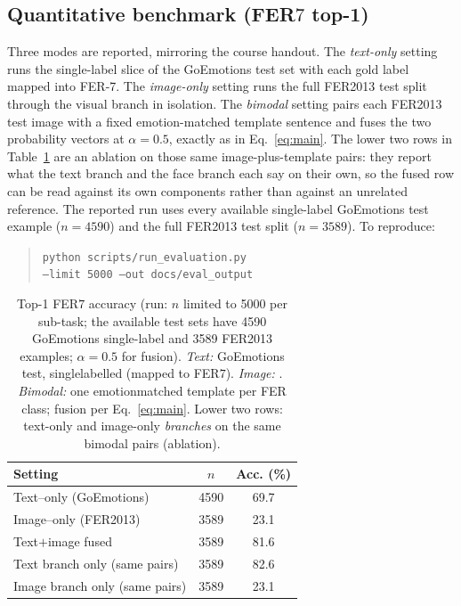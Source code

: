 \documentclass[sigconf,nonacm]{acmart}
\begin{document}
\subsection{Quantitative benchmark (FER\texorpdfstring{$7$}{\,7} top-1)}
Three modes are reported, mirroring the course handout. The \emph{text-only} setting runs the single-label slice of the GoEmotions test set with each gold label mapped into FER-7. The \emph{image-only} setting runs the full FER2013 test split through the visual branch in isolation. The \emph{bimodal} setting pairs each FER2013 test image with a fixed emotion-matched template sentence and fuses the two probability vectors at $\alpha\!=\!0.5$, exactly as in Eq.~\ref{eq:main}. The lower two rows in Table~\ref{tab:results} are an ablation on those same image-plus-template pairs: they report what the text branch and the face branch each say on their own, so the fused row can be read against its own components rather than against an unrelated reference. The reported run uses every available single-label GoEmotions test example ($n\!=\!4590$) and the full FER2013 test split ($n\!=\!3589$). To reproduce:
\begin{quote}\small\noindent
\texttt{python scripts/run\_evaluation.py}\\
\texttt{\hspace*{1em}--limit 5000 --out docs/eval\_output}
\end{quote}

\begin{table}[t]
  \centering
  \small
  \caption{Top-1 FER$7$ accuracy (run: $n$ limited to 5000 per sub-task; the available test sets have 4590 GoEmotions single-label and 3589 FER2013 examples; $\alpha\!=\!0.5$ for fusion). \emph{Text:} GoEmotions test, single\nobreakdash labelled (mapped to FER$7$). \emph{Image:} . \emph{Bimodal:} one emotion\nobreakdash matched template per FER class; fusion per Eq.~\ref{eq:main}. Lower two rows: text-only and image-only \emph{branches} on the same bimodal pairs (ablation).}
  \label{tab:results}
  \begin{tabular}{@{}lcc@{}}
    \toprule
    \textbf{Setting} & \textbf{$n$} & \textbf{Acc. (\%)} \\
    \midrule
    Text--only (GoEmotions) & 4590 & 69.7 \\
    Image--only (FER2013) & 3589 & 23.1 \\
    Text$+$image fused & 3589 & 81.6 \\
    \midrule
    Text branch only (same pairs) & 3589 & 82.6 \\
    Image branch only (same pairs) & 3589 & 23.1 \\
    \bottomrule
  \end{tabular}
\end{table}
\end{document}
